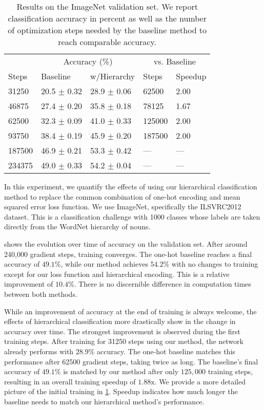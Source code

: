 \documentclass[10pt,twocolumn,letterpaper]{article}
\begin{document}
\begin{table}
\centering
\caption{Results on the ImageNet validation set. We report classification accuracy in percent
as well as the number of optimization steps needed by the baseline method to reach comparable accuracy.}
\label{tbl:expin}
\small
\begin{tabular}{l||l|l||l|l}
 &  \multicolumn{2}{c||}{Accuracy (\%)} & \multicolumn{2}{c}{vs. Baseline}\\
Steps       &      Baseline     &       w/Hierarchy        & Steps & Speedup\\\hline

31250  &  20.5 $\pm$ 0.32  &  28.9 $\pm$ 0.06  &   62500  &  2.00 \\
46875  &  27.4 $\pm$ 0.20  &  35.8 $\pm$ 0.18  &   78125  &  1.67 \\
62500  &  32.3 $\pm$ 0.09  &  41.0 $\pm$ 0.33  &  125000  &  2.00 \\
93750  &  38.4 $\pm$ 0.19  &  45.9 $\pm$ 0.20  &  187500  &  2.00 \\
187500  &  46.9 $\pm$ 0.21  &  53.3 $\pm$ 0.42  &  ---  &  --- \\
234375  &  49.0 $\pm$ 0.33  &  54.2 $\pm$ 0.04  &  ---  &  --- \\


\end{tabular}
\end{table}


In this experiment, we quantify the effects of using our hierarchical classification method
to replace the common combination of one-hot encoding and mean squared error loss function.
We use ImageNet, specifically the ILSVRC2012 dataset. This is a classification challenge with 1000 classes
whose labels are
taken directly from the WordNet hierarchy of nouns. 

 shows the evolution over time of accuracy on the validation set.
After around 240,000 gradient steps, training converges. The one-hot baseline reaches
a final accuracy of $49.1\%$, while our method achieves $54.2\%$ with no changes to training
except for our loss function and hierarchical encoding. This is a relative improvement of $10.4\%$. There is no discernible difference
in computation times between both methods.

While an improvement of accuracy at the end of training is always welcome,
the effects of hierarchical classification more drastically show in the change in accuracy over
time. The strongest improvement is observed during the first training steps.
After training for 31250 steps using our method, the network already performs with $28.9\%$ accuracy.
The one-hot baseline matches this performance after 62500 gradient steps, taking twice as long.
The baseline's final accuracy of $49.1\%$ is matched by our method after only $125,000$ training
steps, resulting in an overall training speedup of $1.88\text{x}$.
We provide a more detailed picture of the initial training in \cref{tbl:expin}. Speedup indicates
how much longer the baseline needs to match our hierarchical method's performance.
\end{document}
